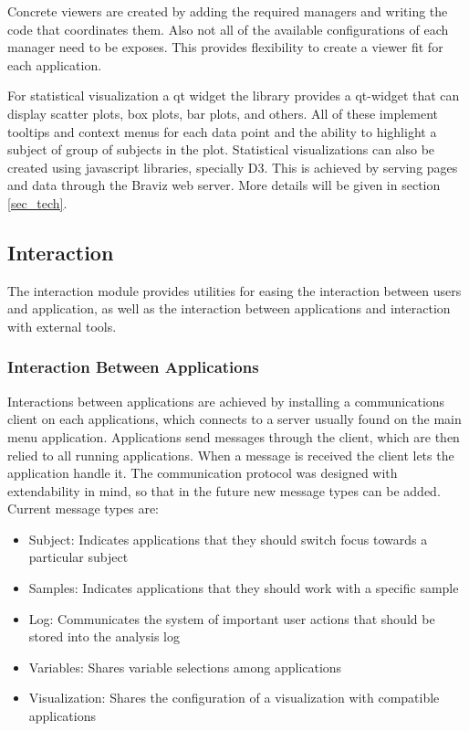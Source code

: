 Concrete viewers are created by adding the required managers and writing the code that coordinates them. Also not all of the available configurations of each manager need to be exposes. This provides flexibility to create a viewer fit for each application.


For statistical visualization a qt widget the library provides a qt-widget that can display scatter plots, box plots, bar plots, and others. All of these implement tooltips and context menus for each data point and the ability to highlight a subject of group of subjects in the plot. Statistical visualizations can also be created using javascript libraries, specially D3. This is achieved by serving pages and data through the Braviz web server. More details will be given in section \ref{sec_tech}.

\subsection{Interaction}

The interaction module provides utilities for easing the interaction between users and application, as well as the interaction between applications and interaction with external tools. 

\subsubsection{Interaction Between Applications}

Interactions between applications are achieved by installing a communications client on each applications, which connects to a server usually found on the main menu application. Applications send messages through the client, which are then relied to all running applications. When a message is received the client lets the application handle it. The communication protocol was designed with extendability in mind, so that in the future new message types can be added. Current message types are:

\begin{itemize}
\item Subject: Indicates applications that they should switch focus towards a particular subject
\item Samples: Indicates applications that they should work with a specific sample
\item Log: Communicates the system of important user actions that should be stored into the analysis log
\item Variables: Shares variable selections among applications
\item Visualization: Shares the configuration of a visualization with compatible applications
\end{itemize}



